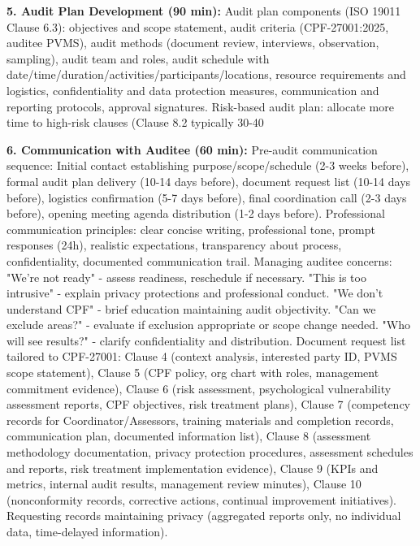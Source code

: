 \documentclass[11pt,a4paper]{article}
\begin{document}
\textbf{5. Audit Plan Development (90 min):} Audit plan components (ISO 19011 Clause 6.3): objectives and scope statement, audit criteria (CPF-27001:2025, auditee PVMS), audit methods (document review, interviews, observation, sampling), audit team and roles, audit schedule with date/time/duration/activities/participants/locations, resource requirements and logistics, confidentiality and data protection measures, communication and reporting protocols, approval signatures. Risk-based audit plan: allocate more time to high-risk clauses (Clause 8.2 typically 30-40%

\textbf{6. Communication with Auditee (60 min):} Pre-audit communication sequence: Initial contact establishing purpose/scope/schedule (2-3 weeks before), formal audit plan delivery (10-14 days before), document request list (10-14 days before), logistics confirmation (5-7 days before), final coordination call (2-3 days before), opening meeting agenda distribution (1-2 days before). Professional communication principles: clear concise writing, professional tone, prompt responses (24h), realistic expectations, transparency about process, confidentiality, documented communication trail. Managing auditee concerns: "We're not ready" - assess readiness, reschedule if necessary. "This is too intrusive" - explain privacy protections and professional conduct. "We don't understand CPF" - brief education maintaining audit objectivity. "Can we exclude areas?" - evaluate if exclusion appropriate or scope change needed. "Who will see results?" - clarify confidentiality and distribution. Document request list tailored to CPF-27001: Clause 4 (context analysis, interested party ID, PVMS scope statement), Clause 5 (CPF policy, org chart with roles, management commitment evidence), Clause 6 (risk assessment, psychological vulnerability assessment reports, CPF objectives, risk treatment plans), Clause 7 (competency records for Coordinator/Assessors, training materials and completion records, communication plan, documented information list), Clause 8 (assessment methodology documentation, privacy protection procedures, assessment schedules and reports, risk treatment implementation evidence), Clause 9 (KPIs and metrics, internal audit results, management review minutes), Clause 10 (nonconformity records, corrective actions, continual improvement initiatives). Requesting records maintaining privacy (aggregated reports only, no individual data, time-delayed information).
\end{document}
